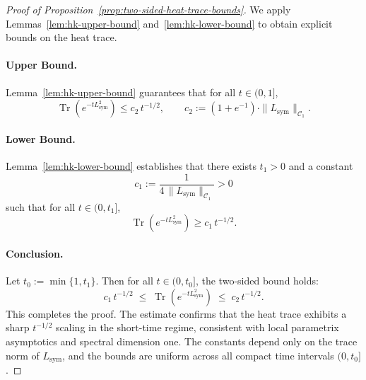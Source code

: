 \begin{proof}[Proof of Proposition~\ref{prop:two-sided-heat-trace-bounds}]
We apply Lemmas~\ref{lem:hk-upper-bound} and~\ref{lem:hk-lower-bound} to obtain explicit bounds on the heat trace.

\paragraph{Upper Bound.}
Lemma~\ref{lem:hk-upper-bound} guarantees that for all \( t \in (0,1] \),
\[
\operatorname{Tr}(e^{-t L_{\mathrm{sym}}^2}) \leq c_2 \, t^{-1/2}, \qquad
c_2 := (1 + e^{-1}) \cdot \| L_{\mathrm{sym}} \|_{\mathcal{C}_1}.
\]

\paragraph{Lower Bound.}
Lemma~\ref{lem:hk-lower-bound} establishes that there exists \( t_1 > 0 \) and a constant
\[
c_1 := \frac{1}{4 \, \| L_{\mathrm{sym}} \|_{\mathcal{C}_1}} > 0
\]
such that for all \( t \in (0, t_1] \),
\[
\operatorname{Tr}(e^{-t L_{\mathrm{sym}}^2}) \geq c_1 \, t^{-1/2}.
\]

\paragraph{Conclusion.}
Let \( t_0 := \min\{1, t_1\} \). Then for all \( t \in (0, t_0] \), the two-sided bound holds:
\[
c_1 \, t^{-1/2} \;\leq\; \operatorname{Tr}(e^{-t L_{\mathrm{sym}}^2}) \;\leq\; c_2 \, t^{-1/2}.
\]
This completes the proof. The estimate confirms that the heat trace exhibits a sharp \( t^{-1/2} \) scaling in the short-time regime, consistent with local parametrix asymptotics and spectral dimension one. The constants depend only on the trace norm of \( L_{\mathrm{sym}} \), and the bounds are uniform across all compact time intervals \( (0, t_0] \).
\end{proof}

